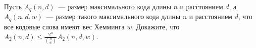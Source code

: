 Пусть $A_q(n, d)$~--- размер максимального кода длины $n$ и расстоянием $d$, а $A_q(n, d, w)$~--- размер такого максимального
кода длины $n$ и расстоянием $d$, что все кодовые слова имеют вес Хемминга $w$. Докажите, что $A_2(n, d) \le
\frac{2^n}{\binom{n}{w}} A_2(n, d, w)$.